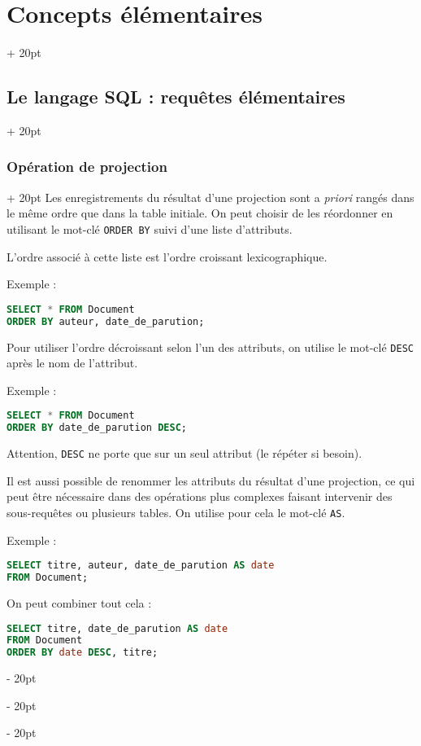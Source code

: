 \documentclass[a4paper, 12pt, twoside]{article}
\newcommand{\ind}[1][20pt]{\advance\leftskip + #1}
\newcommand{\deind}[1][20pt]{\advance\leftskip - #1}
\newenvironment{indt}[2][20pt]{#2 \par \ind[#1]}{\par \deind} %
\begin{document}
\begin{indt}{\section{Concepts élémentaires}}
\begin{indt}{\subsection{Le langage SQL : requêtes élémentaires}}
\begin{indt}{\subsubsection{Opération de projection}}
               Les enregistrements du résultat d'une projection sont a \textit{priori} rangés dans le même ordre que dans la table initiale. On peut choisir de les réordonner en utilisant le mot-clé \texttt{ORDER BY} suivi d'une liste d'attributs.
               
               L'ordre associé à cette liste est l'ordre croissant lexicographique.
               
               Exemple :
               
                \begin{lstlisting}[language=SQL, xleftmargin=80pt]
SELECT * FROM Document
ORDER BY auteur, date_de_parution;\end{lstlisting}
                
                Pour utiliser l'ordre décroissant selon l'un des attributs, on utilise le mot-clé \texttt{DESC} après le nom de l'attribut.
                
                Exemple :
                
                \begin{lstlisting}[language=SQL, xleftmargin=80pt]
SELECT * FROM Document
ORDER BY date_de_parution DESC;\end{lstlisting}
                
                Attention, \texttt{DESC} ne porte que sur un seul attribut (le répéter si besoin).
                
                \vspace{12pt}
                
                Il est aussi possible de renommer les attributs du résultat d'une projection, ce qui peut être nécessaire dans des opérations plus complexes faisant intervenir des sous-requêtes ou plusieurs tables. On utilise pour cela le mot-clé \texttt{AS}.
                
                Exemple :
                
                \begin{lstlisting}[language=SQL, xleftmargin=80pt]
SELECT titre, auteur, date_de_parution AS date
FROM Document;\end{lstlisting}
                
                On peut combiner tout cela :
                
                \begin{lstlisting}[language=SQL, xleftmargin=80pt]
SELECT titre, date_de_parution AS date
FROM Document
ORDER BY date DESC, titre;\end{lstlisting}
            \end{indt}
        \end{indt}
        
    \end{indt}
    
    
    
\end{document}
